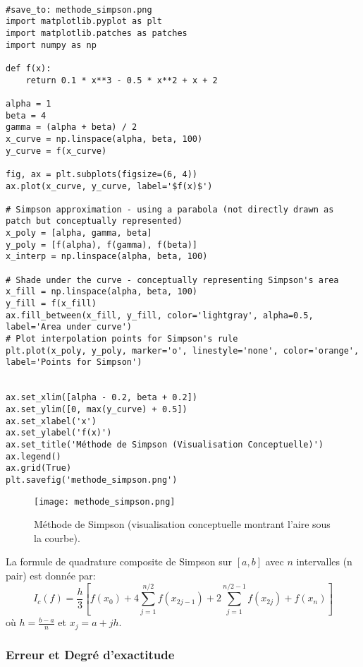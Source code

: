 \documentclass{article}
\begin{document}
\begin{verbatim}

#save_to: methode_simpson.png
import matplotlib.pyplot as plt
import matplotlib.patches as patches
import numpy as np

def f(x):
    return 0.1 * x**3 - 0.5 * x**2 + x + 2

alpha = 1
beta = 4
gamma = (alpha + beta) / 2
x_curve = np.linspace(alpha, beta, 100)
y_curve = f(x_curve)

fig, ax = plt.subplots(figsize=(6, 4))
ax.plot(x_curve, y_curve, label='$f(x)$')

# Simpson approximation - using a parabola (not directly drawn as patch but conceptually represented)
x_poly = [alpha, gamma, beta]
y_poly = [f(alpha), f(gamma), f(beta)]
x_interp = np.linspace(alpha, beta, 100)

# Shade under the curve - conceptually representing Simpson's area
x_fill = np.linspace(alpha, beta, 100)
y_fill = f(x_fill)
ax.fill_between(x_fill, y_fill, color='lightgray', alpha=0.5, label='Area under curve')
# Plot interpolation points for Simpson's rule
plt.plot(x_poly, y_poly, marker='o', linestyle='none', color='orange', label='Points for Simpson')


ax.set_xlim([alpha - 0.2, beta + 0.2])
ax.set_ylim([0, max(y_curve) + 0.5])
ax.set_xlabel('x')
ax.set_ylabel('f(x)')
ax.set_title('Méthode de Simpson (Visualisation Conceptuelle)')
ax.legend()
ax.grid(True)
plt.savefig('methode_simpson.png')

\end{verbatim}

\begin{figure}[h]
    \centering
    \texttt{[image: methode\_simpson.png]}
    \caption{Méthode de Simpson (visualisation conceptuelle montrant l'aire sous la courbe).}
    \label{fig:methode_simpson}
\end{figure}

La formule de quadrature composite de Simpson sur $[a, b]$ avec $n$ intervalles (n pair) est donnée par:
\[
I_c(f) = \frac{h}{3} \left[ f(x_0) + 4 \sum_{j=1}^{n/2} f(x_{2j-1}) + 2 \sum_{j=1}^{n/2-1} f(x_{2j}) + f(x_n) \right]
\]
où $h = \frac{b-a}{n}$ et $x_j = a + jh$.

\subsubsection{Erreur et Degré d'exactitude}
\end{document}
